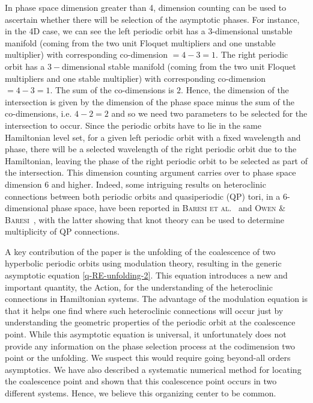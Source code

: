\documentclass[10pt]{article}
\begin{document}
 In phase space dimension greater than 4, dimension counting can be used to ascertain whether there will be selection of the asymptotic phases. For instance, in the 4D case, we can see the left periodic orbit has a 3-dimensional unstable manifold (coming from the two unit Floquet multipliers
and one unstable multiplier) with corresponding co-dimension $= 4-3 = 1$. The
right periodic orbit has a $3-$dimensional stable manifold (coming from the two
unit Floquet multipliers and one stable multiplier) with corresponding
co-dimension $= 4-3 = 1$. The sum of the co-dimensions is $2$. Hence, the
dimension of the intersection is given by the dimension of the phase space minus
the sum of the co-dimensions, i.e. $4-2 = 2$ and so we need two parameters to be selected for the intersection to occur. Since the periodic orbits have to lie in the same Hamiltonian level set, for a given left periodic orbit with a fixed wavelength and phase, there will be a selected wavelength of the right periodic orbit due to the Hamiltonian, leaving the phase of the right periodic orbit to be selected as part of the intersection.  This dimension counting argument carries over to phase space dimension 6 and higher.  Indeed, some intriguing results on heteroclinic connections between both periodic orbits and quasiperiodic (QP) tori, in a 6-dimensional phase space, have been reported in \textsc{Baresi et al.}~\cite{bos18} and \textsc{Owen \& Baresi}~\cite{ob24}, with the latter showing that knot theory can be used to determine multiplicity of QP connections. 

 A key contribution of the paper is the unfolding of the coalescence of two hyperbolic periodic orbits using modulation theory, resulting in the generic asymptotic equation \eqref{q-RE-unfolding-2}. This equation introduces a new and important quantity, the Action, for the understanding of the heteroclinic connections in Hamiltonian systems. The advantage of the modulation equation is that it helps one find where such heteroclinic connections will occur just by understanding the geometric properties of the periodic orbit at the coalescence point. While this asymptotic equation is universal, it unfortunately does not provide any information on the phase selection process at the codimension two point or the unfolding. We suspect this would require going beyond-all orders asymptotics. We have also described a systematic numerical method for locating the coalescence point and shown that this coalescence point occurs in two different systems. Hence, we believe this organizing center to be common. 
\end{document}
